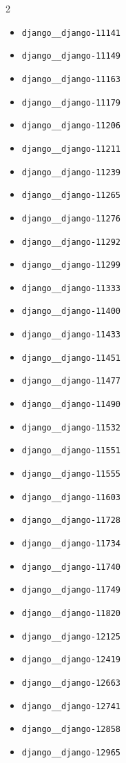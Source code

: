 \documentclass{article} %
\begin{document}
\begin{multicols}{2}
\begin{itemize}
    \item \texttt{django\_\_django-11141}
    \item \texttt{django\_\_django-11149}
    \item \texttt{django\_\_django-11163}
    \item \texttt{django\_\_django-11179}
    \item \texttt{django\_\_django-11206}
    \item \texttt{django\_\_django-11211}
    \item \texttt{django\_\_django-11239}
    \item \texttt{django\_\_django-11265}
    \item \texttt{django\_\_django-11276}
    \item \texttt{django\_\_django-11292}
    \item \texttt{django\_\_django-11299}
    \item \texttt{django\_\_django-11333}
    \item \texttt{django\_\_django-11400}
    \item \texttt{django\_\_django-11433}
    \item \texttt{django\_\_django-11451}
    \item \texttt{django\_\_django-11477}
    \item \texttt{django\_\_django-11490}
    \item \texttt{django\_\_django-11532}
    \item \texttt{django\_\_django-11551}
    \item \texttt{django\_\_django-11555}
    \item \texttt{django\_\_django-11603}
    \item \texttt{django\_\_django-11728}
    \item \texttt{django\_\_django-11734}
    \item \texttt{django\_\_django-11740}
    \item \texttt{django\_\_django-11749}
    \item \texttt{django\_\_django-11820}
    \item \texttt{django\_\_django-12125}
    \item \texttt{django\_\_django-12419}
    \item \texttt{django\_\_django-12663}
    \item \texttt{django\_\_django-12741}
    \item \texttt{django\_\_django-12858}
    \item \texttt{django\_\_django-12965}

\end{itemize}
\end{multicols}
\end{document}
